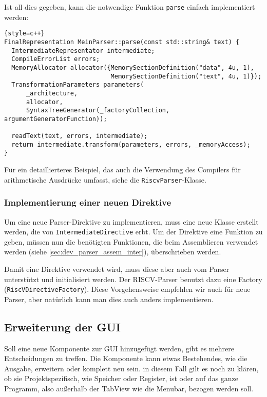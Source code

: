 Ist all dies gegeben, kann die notwendige Funktion \texttt{parse} einfach
implementiert werden:

\begin{lstlisting}{style=c++}
FinalRepresentation MeinParser::parse(const std::string& text) {
  IntermediateRepresentator intermediate;
  CompileErrorList errors;
  MemoryAllocator allocator({MemorySectionDefinition("data", 4u, 1),
                             MemorySectionDefinition("text", 4u, 1)});
  TransformationParameters parameters(
      _architecture,
      allocator,
      SyntaxTreeGenerator(_factoryCollection, argumentGeneratorFunction));

  readText(text, errors, intermediate);
  return intermediate.transform(parameters, errors, _memoryAccess);
}
\end{lstlisting}

Für ein detaillierteres Beispiel, das auch die Verwendung des Compilers für
arithmetische Ausdrücke umfasst, siehe die \texttt{RiscvParser}-Klasse.

\subsubsection{Implementierung einer neuen Direktive}

Um eine neue Parser-Direktive zu implementieren, muss eine neue Klasse erstellt
werden, die von \texttt{Intermediate\-Directive} erbt. Um der Direktive eine
Funktion zu geben, müssen nun die benötigten Funktionen, die beim Assemblieren
verwendet werden (siehe \autoref{sec:dev_parser_assem_inter}), überschrieben
werden.

Damit eine Direktive verwendet wird, muss diese aber auch vom Parser unterstützt
und initialisiert werden. Der RISCV-Parser benutzt dazu eine Factory
(\texttt{RiscV\-Directive\-Factory}). Diese Vorgehensweise empfehlen wir auch
für neue Parser, aber natürlich kann man dies auch anders implementieren.

\subsection{Erweiterung der GUI}
Soll eine neue Komponente zur GUI hinzugefügt werden, gibt es mehrere
Entscheidungen zu treffen. Die Komponente kann etwas Bestehendes, wie die
Ausgabe, erweitern oder komplett neu sein. in diesem Fall gilt es noch zu
klären, ob sie Projektspezifisch, wie Speicher oder Register, ist oder auf das
ganze Programm, also außerhalb der TabView wie die Menubar, bezogen werden soll.

